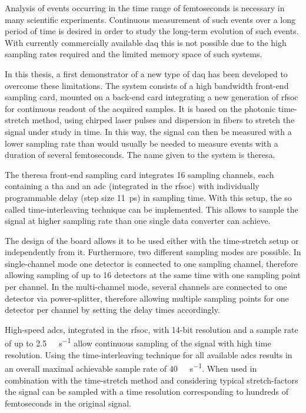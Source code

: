 
Analysis of events occurring in the time range of femtoseconds is necessary in many scientific experiments.
Continuous measurement of such events over a long period of time is desired in order to study the long-term evolution of such events.
With currently commercially available \gls{daq} this is not possible due to the high sampling rates required and the limited memory space of such systems. 

In this thesis, a first demonstrator of a new type of \gls{daq} has been developed to overcome these limitations.
The system consists of a high bandwidth front-end sampling card, mounted on a back-end card integrating a new generation of \gls{rfsoc} for continuous readout of the acquired samples. 
It is based on the photonic time-stretch method, using chirped laser pulses and dispersion in fibers to stretch the signal under study in time.
In this way, the signal can then be measured with a lower sampling rate than would usually be needed to measure events with a duration of several femtoseconds.
The name given to the system is \gls{theresa}.

The \gls{theresa} front-end sampling card integrates 16 sampling channels, each containing a \gls{tha} and an \gls{adc} (integrated in the \gls{rfsoc}) with individually programmable delay (step size \SI{11}{\pico \second}) in sampling time. 
With this setup, the so called time-interleaving technique can be implemented. 
This allows to sample the signal at higher sampling rate than one single data converter can achieve.

The design of the board allows it to be used either with the time-stretch setup or independently from it.
Furthermore, two different sampling modes are possible.
In single-channel mode one detector is connected to one sampling channel, therefore allowing sampling of up to 16 detectors at the same time with one sampling point per channel.
In the multi-channel mode, several channels are connected to one detector via power-splitter, therefore allowing multiple sampling points for one detector per channel by setting the delay times accordingly. 

High-speed \glspl{adc}, integrated in the \gls{rfsoc}, with 14-bit resolution and a sample rate of up to \SI{2.5}{\giga \sample\per\second} allow continuous sampling of the signal with high time resolution. 
Using the time-interleaving technique for all available \glspl{adc} results in an overall maximal achievable sample rate of \SI{40}{\giga\sample\per\second}. 
When used in combination with the time-stretch method and considering typical stretch-factors the signal can be sampled with a time resolution corresponding to hundreds of femtoseconds in the original signal.

